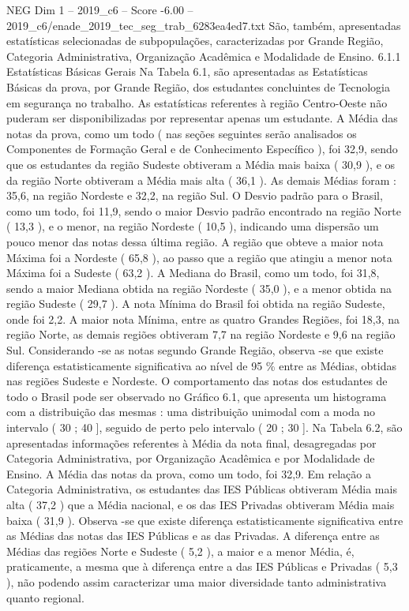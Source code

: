 \begin{textsample}{NEG Dim 1 – 2019\_c6 – Score -6.00 – 2019\_c6/enade\_2019\_tec\_seg\_trab\_6283ea4ed7.txt}
São, também, apresentadas estatísticas selecionadas de subpopulações, caracterizadas por Grande Região, Categoria Administrativa, Organização Acadêmica e Modalidade de Ensino. 6.1.1 Estatísticas Básicas Gerais Na Tabela 6.1, são apresentadas as Estatísticas Básicas da prova, por Grande Região, dos estudantes concluintes de Tecnologia em segurança no trabalho.
As estatísticas referentes à região Centro-Oeste não puderam ser disponibilizadas por representar apenas um estudante.
A Média das notas da prova, como um todo ( nas seções seguintes serão analisados os Componentes de Formação Geral e de Conhecimento Específico ), foi 32,9, sendo que os estudantes da região Sudeste obtiveram a Média mais baixa ( 30,9 ), e os da região Norte obtiveram a Média mais alta ( 36,1 ).
As demais Médias foram : 35,6, na região Nordeste e 32,2, na região Sul.
O Desvio padrão para o Brasil, como um todo, foi 11,9, sendo o maior Desvio padrão encontrado na região Norte ( 13,3 ), e o menor, na região Nordeste ( 10,5 ), indicando uma dispersão um pouco menor das notas dessa última região.
A região que obteve a maior nota Máxima foi a Nordeste ( 65,8 ), ao passo que a região que atingiu a menor nota Máxima foi a Sudeste ( 63,2 ).
A Mediana do Brasil, como um todo, foi 31,8, sendo a maior Mediana obtida na região Nordeste ( 35,0 ), e a menor obtida na região Sudeste ( 29,7 ).
A nota Mínima do Brasil foi obtida na região Sudeste, onde foi 2,2.
A maior nota Mínima, entre as quatro Grandes Regiões, foi 18,3, na região Norte, as demais regiões obtiveram 7,7 na região Nordeste e 9,6 na região Sul.
Considerando -se as notas segundo Grande Região, observa -se que existe diferença estatisticamente significativa ao nível de 95 \% entre as Médias, obtidas nas regiões Sudeste e Nordeste.
O comportamento das notas dos estudantes de todo o Brasil pode ser observado no Gráfico 6.1, que apresenta um histograma com a distribuição das mesmas : uma distribuição unimodal com a moda no intervalo ( 30 ; 40 ], seguido de perto pelo intervalo ( 20 ; 30 ].
Na Tabela 6.2, são apresentadas informações referentes à Média da nota final, desagregadas por Categoria Administrativa, por Organização Acadêmica e por Modalidade de Ensino.
A Média das notas da prova, como um todo, foi 32,9.
Em relação a Categoria Administrativa, os estudantes das IES Públicas obtiveram Média mais alta ( 37,2 ) que a Média nacional, e os das IES Privadas obtiveram Média mais baixa ( 31,9 ).
Observa -se que existe diferença estatisticamente significativa entre as Médias das notas das IES Públicas e as das Privadas.
A diferença entre as Médias das regiões Norte e Sudeste ( 5,2 ), a maior e a menor Média, é, praticamente, a mesma que à diferença entre a das IES Públicas e Privadas ( 5,3 ), não podendo assim caracterizar uma maior diversidade tanto administrativa quanto regional.

\end{textsample}
